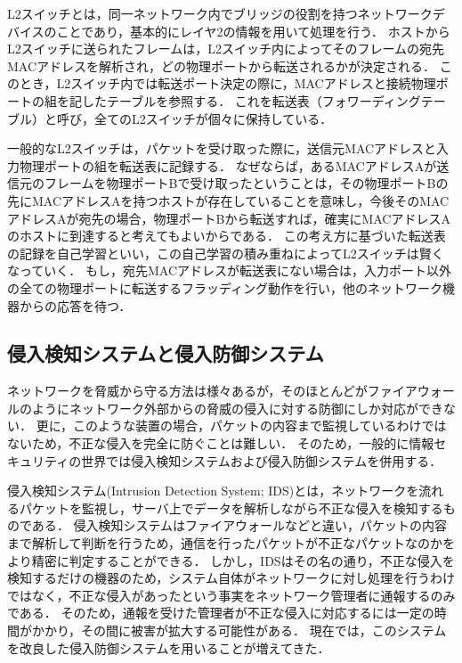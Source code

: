 L2スイッチとは，同一ネットワーク内でブリッジの役割を持つネットワークデバイスのことであり，基本的にレイヤ2の情報を用いて処理を行う\cite{masteringtcpip}．
ホストからL2スイッチに送られたフレームは，L2スイッチ内によってそのフレームの宛先MACアドレスを解析され，どの物理ポートから転送されるかが決定される．
このとき，L2スイッチ内では転送ポート決定の際に，MACアドレスと接続物理ポートの組を記したテーブルを参照する．
これを転送表（フォワーディングテーブル）と呼び，全てのL2スイッチが個々に保持している．

一般的なL2スイッチは，パケットを受け取った際に，送信元MACアドレスと入力物理ポートの組を転送表に記録する．
なぜならば，あるMACアドレスAが送信元のフレームを物理ポートBで受け取ったということは，その物理ポートBの先にMACアドレスAを持つホストが存在していることを意味し，今後そのMACアドレスAが宛先の場合，物理ポートBから転送すれば，確実にMACアドレスAのホストに到達すると考えてもよいからである．
この考え方に基づいた転送表の記録を自己学習といい，この自己学習の積み重ねによってL2スイッチは賢くなっていく．
もし，宛先MACアドレスが転送表にない場合は，入力ポート以外の全ての物理ポートに転送するフラッディング動作を行い，他のネットワーク機器からの応答を待つ．

\subsection{侵入検知システムと侵入防御システム}

ネットワークを脅威から守る方法は様々あるが，そのほとんどがファイアウォールのようにネットワーク外部からの脅威の侵入に対する防御にしか対応ができない．
更に，このような装置の場合，パケットの内容まで監視しているわけではないため，不正な侵入を完全に防ぐことは難しい．
そのため，一般的に情報セキュリティの世界では侵入検知システムおよび侵入防御システムを併用する．

侵入検知システム(Intrusion Detection System; IDS)とは，ネットワークを流れるパケットを監視し，サーバ上でデータを解析しながら不正な侵入を検知するものである\cite{idsandips}．
侵入検知システムはファイアウォールなどと違い，パケットの内容まで解析して判断を行うため，通信を行ったパケットが不正なパケットなのかをより精密に判定することができる．
しかし，IDSはその名の通り，不正な侵入を検知するだけの機器のため，システム自体がネットワークに対し処理を行うわけではなく，不正な侵入があったという事実をネットワーク管理者に通報するのみである．
そのため，通報を受けた管理者が不正な侵入に対応するには一定の時間がかかり，その間に被害が拡大する可能性がある．
現在では，このシステムを改良した侵入防御システムを用いることが増えてきた．

